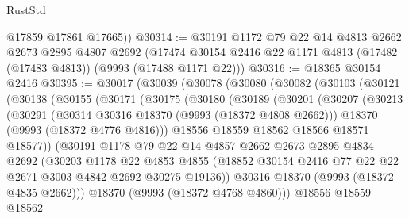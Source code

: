 \begin{lexlean}{RustStd}
\begin{coremodule}
        @17859
        @17861
        @17665))
@30314 := @30191
    @1172
    @79
    @22
    @14
    @4813
    @2662
    @2673
    @2895
    @4807
    @2692
    (@17474 @30154 @2416 @22 @1171 @4813 (@17482 (@17483 @4813)) (@9993 (@17488 @1171 @22)))
@30316 := @18365 @30154 @2416
@30395 := @30017
    (@30039
      (@30078
        (@30080
          (@30082
            (@30103
              (@30121
                (@30138
                  (@30155
                    (@30171
                      (@30175
                        (@30180
                          (@30189
                            (@30201
                              (@30207
                                (@30213
                                  (@30291
                                    (@30314 @30316 @18370 (@9993 (@18372 @4808 @2662)))
                                    @18370
                                    (@9993 (@18372 @4776 @4816)))
                                  @18556
                                  @18559
                                  @18562
                                  @18566
                                  @18571
                                  @18577))
                              (@30191
                                @1178
                                @79
                                @22
                                @14
                                @4857
                                @2662
                                @2673
                                @2895
                                @4834
                                @2692
                                (@30203
                                  @1178
                                  @22
                                  @4853
                                  @4855
                                  (@18852
                                    @30154
                                    @2416
                                    @77
                                    @22
                                    @22
                                    @2671
                                    @3003
                                    @4842
                                    @2692
                                    @30275
                                    @19136))
                                @30316
                                @18370
                                (@9993 (@18372 @4835 @2662)))
                              @18370
                              (@9993 (@18372 @4768 @4860)))
                            @18556
                            @18559
                            @18562

\end{coremodule}
\end{lexlean}
